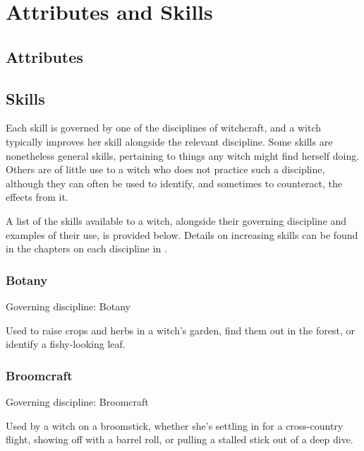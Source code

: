 \chapter{Attributes and Skills}

\section{Attributes}

\section{Skills}



Each skill is governed by one of the disciplines of witchcraft, and a witch typically improves her skill alongside the relevant discipline.
Some skills are nonetheless general skills, pertaining to things any witch might find herself doing.
Others are of little use to a witch who does not practice such a discipline, although they can often be used to identify, and sometimes to counteract, the effects from it.

A list of the skills available to a witch, alongside their governing discipline and examples of their use, is provided below.
Details on increasing skills can be found in the chapters on each discipline in .

\newcommand\govdisc[1]{Governing discipline: #1} %

\subsection{Botany}
\govdisc{Botany}

Used to raise crops and herbs in a witch's garden, find them out in the forest, or identify a fishy-looking leaf.

\subsection{Broomcraft}
\govdisc{Broomcraft}

Used by a witch on a broomstick, whether she's settling in for a cross-country flight, showing off with a barrel roll, or pulling a stalled stick out of a deep dive.

